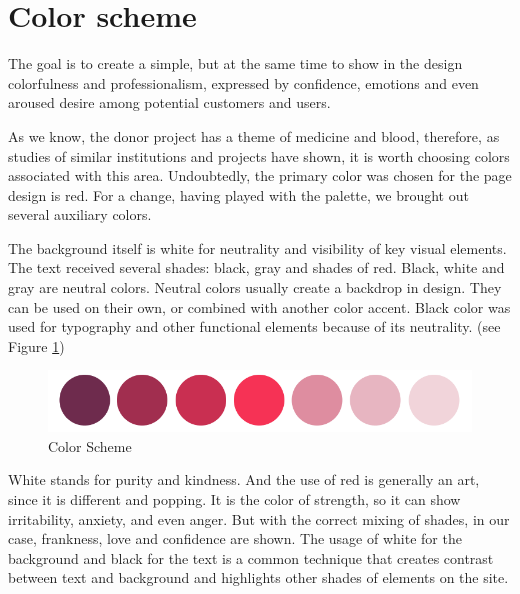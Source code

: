 \section{Color scheme}
The goal is to create a simple, but at the same time to show in the design colorfulness and professionalism, expressed by confidence, emotions and even aroused desire among potential customers and users. 
\par
As we know, the donor project has a theme of medicine and blood, therefore, as studies of similar institutions and projects have shown, it is worth choosing colors associated with this area. Undoubtedly, the primary color was chosen for the page design is red. For a change, having played with the palette, we brought out several auxiliary colors. 
\par
The background itself is white for neutrality and visibility of key visual elements. The text received several shades: black, gray and shades of red. Black, white and gray are neutral colors. Neutral colors usually create a backdrop in design. They can be used on their own, or combined with another color accent. Black color was used for typography and other functional elements because of its neutrality. (see Figure \ref{fig:colorscheme})
\begin{figure}[h]
    \centering
    \includegraphics[scale=0.5]{figures/4.png}
    \caption{Color Scheme}
    \label{fig:colorscheme}
\end{figure}
\par
White stands for purity and kindness. And the use of red is generally an art, since it is different and popping. It is the color of strength, so it can show irritability, anxiety, and even anger. But with the correct mixing of shades, in our case, frankness, love and confidence are shown.
The usage of white for the background and black for the text is a common technique that creates contrast between text and background and highlights other shades of elements on the site.

